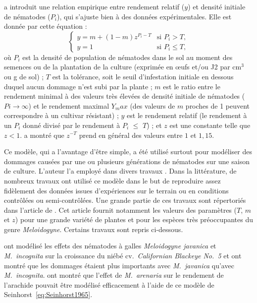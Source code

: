 	\citet{Seinhorst1965} a introduit une relation empirique entre rendement relatif ($y$) et densité initiale de nématodes ($P_i$), qui s'ajuste bien à des données expérimentales. Elle  est donnée  par cette équation :  
	\begin{equation}
	    \begin{cases}
	      y  =  m + (1-m)  z^{P_i-T} & \text{si }  P_i>T,  \\
	      y  = 1 &\text{si } P_i \leqslant T,
	    \end{cases}
	  \label{eq:Seinhorst1965}
	\end{equation}
où $P_i$ est la densité de population de nématodes dans le sol
au moment des semences ou de la plantation de la culture (exprimée en
œufs et/ou J2 par cm$^3$ ou g de sol) ; $T$ est la  tolérance, soit le seuil d'infestation initiale en dessous duquel aucun dommage n'est subi par la plante ;  $m$ est le ratio entre le rendement minimal à des valeurs très élevées de densité initiale de nématodes ($Pi  \rightarrow \infty$)  et le rendement maximal $Y_max$ (des valeurs de $m$ proches de 1 peuvent correspondre à un cultivar résistant) ; $y$ est le rendement relatif (le rendement à un
	 $P_i$ donné divisé par le rendement à $P_i$  $\leq$ $T$) ; et $z$ est une constante telle que $z<1$. \citet{Seinhorst1965,Seinhorst1970} a montré que $z^{-T}$  prend en général des valeurs entre $1$ et $1,15$.
	
	Ce modèle, qui a l'avantage d'être simple, a été utilisé surtout pour modéliser des
dommages causées par  une ou plusieurs générations de nématodes sur une
saison de culture. L'auteur l'a employé dans divers travaux \citep[par exemple]{Seinhorst1965,Seinhorst1970, Seinhorst1972, Seinhorst1986, Seinhorst1998}.
Dans la littérature,  de nombreux  travaux ont utilisé ce modèle  dans le  but de reproduire assez fidèlement des données issues d'expériences sur le terrain ou en conditions contrôlées ou semi-contrôlées. Une grande partie de ces travaux sont répertoriés  dans l'article  de  \citet{Greco2010}. Cet article fournit notamment les valeurs des paramètres  ($T$, $m$ et $z$) pour une grande variété de plantes et pour les espèces très préoccupantes du genre \textit{Meloidogyne}. Certains travaux sont repris ci-dessous.
	
	 \citet{Duncan1983} ont modélisé les effets des nématodes à galles \textit{Meloidogyne javanica} et \textit{M.~incognita} sur la croissance du niébé cv.~\textit{Californian Blackeye No.~5}  et ont montré que les dommages étaient plus importants avec \textit{M.~javanica} qu'avec \textit{M.~incognita}.  \citet{McSorley1992} ont montré  que l'effet de \textit{M.~arenaria} sur le rendement de l'arachide pouvait être modélisé efficacement à l'aide de ce modèle de Seinhorst~\eqref{eq:Seinhorst1965}. 
	
